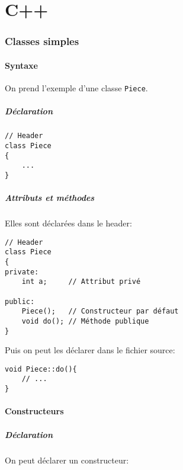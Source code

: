 \documentclass[10pt,a4paper,french]{article}
\begin{document}
\part{C++}

\section{Classes simples}

\subsection{Syntaxe}

On prend l'exemple d'une classe {\tt Piece}.

\subsubsection{Déclaration}

\begin{verbatim}
// Header
class Piece
{
    ...
}
\end{verbatim}

\subsubsection{Attributs et méthodes}

Elles sont déclarées dans le header:

\begin{verbatim}
// Header
class Piece
{
private:
    int a;     // Attribut privé

public:
    Piece();   // Constructeur par défaut
    void do(); // Méthode publique
}
\end{verbatim}

Puis on peut les déclarer dans le fichier source:

\begin{verbatim}
void Piece::do(){
    // ...
}
\end{verbatim}

\subsection{Constructeurs}

\subsubsection{Déclaration}

On peut déclarer un constructeur:
\end{document}
